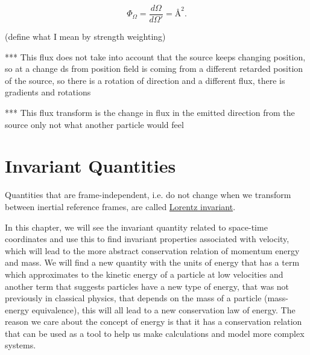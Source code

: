 \begin{equation}
	\label{eq: aberrational wavefront weighting}
	\Phi_\Omega = \frac{d\Omega}{d\Omega'} = \text{\AA}^2.
\end{equation}

(define what I mean by strength weighting)

*** This flux does not take into account that the source keeps changing position, so at a change ds from position field is coming from a different retarded position of the source, so there is a rotation of direction and a different flux, there is gradients and rotations

*** This flux transform is the change in flux in the emitted direction from the source only not what another particle would feel



\printbibliography[segment=\therefsegment, heading=subbibliography]

\chapter{Invariant Quantities} \label{ch: Invariant Quantities}

Quantities that are frame-independent, i.e.
do not change when we transform between inertial reference frames, are called \hyperlink{def-lorentz-invariant}{Lorentz invariant}.

In this chapter, we will see the invariant quantity related to space-time coordinates and use this to find invariant properties associated with velocity, which will lead to the more abstract conservation relation of momentum energy and mass.
We will find a new quantity with the units of energy that has a term which approximates to the kinetic energy of a particle at low velocities and another term that suggests particles have a new type of energy, that was not previously in classical physics, that depends on the mass of a particle (mass-energy equivalence), this will all lead to a new conservation law of energy.
The reason we care about the concept of energy is that it has a conservation relation that can be used as a tool to help us make calculations and model more complex systems.

